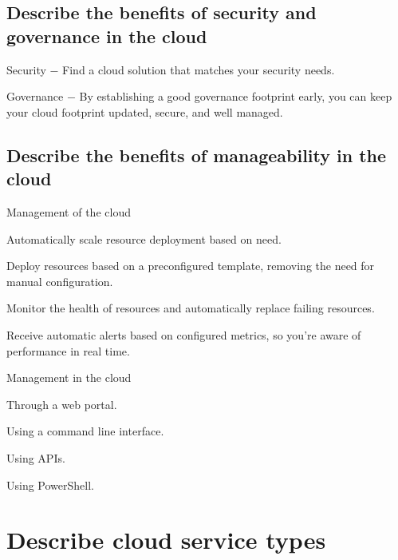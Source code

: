 \documentclass[12pt,a4paper]{report}
\begin{document}
\subsection{Describe the benefits of security and governance in the cloud}
\begin{mylist1}
    \item Security $-$ Find a cloud solution that matches your security needs.
    \item Governance $-$ By establishing a good governance footprint early, you can keep your cloud footprint updated, secure, and well managed.
\end{mylist1}
\subsection{Describe the benefits of manageability in the cloud}
\begin{mylist1}
    \item Management of the cloud
    \begin{mylist2}
        \item Automatically scale resource deployment based on need.
        \item Deploy resources based on a preconfigured template, removing the need for manual configuration.
        \item Monitor the health of resources and automatically replace failing resources.
        \item Receive automatic alerts based on configured metrics, so you’re aware of performance in real time.
    \end{mylist2}
    \item Management in the cloud
    \begin{mylist2}
        \item Through a web portal.
        \item Using a command line interface.
        \item Using APIs.
        \item Using PowerShell.
    \end{mylist2}
\end{mylist1}
\section{Describe cloud service types}
\end{document}
